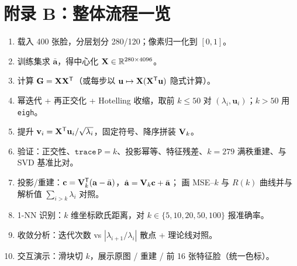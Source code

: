 \section*{附录 B：整体流程一览}

\begin{enumerate}
  \item 载入 400 张脸，分层划分 280/120；像素归一化到 $[0,1]$。
  \item 训练集求 $\bar{\mathbf{a}}$，得中心化 $\mathbf{X}\in\mathbb{R}^{280\times4096}$。
  \item 计算 $\mathbf{G}=\mathbf{X}\mathbf{X}^{\mathsf{T}}$（或每步以 $\mathbf{u}\mapsto\mathbf{X}(\mathbf{X}^{\mathsf{T}}\mathbf{u})$ 隐式计算）。
  \item 幂迭代 + 再正交化 + Hotelling 收缩，取前 $k\le 50$ 对 $(\lambda_i,\mathbf{u}_i)$；$k>50$ 用 \texttt{eigh}。
  \item 提升 $\mathbf{v}_i=\mathbf{X}^{\mathsf{T}}\mathbf{u}_i/\sqrt{\lambda_i}$，固定符号、降序拼装 $\mathbf{V}_k$。
  \item 验证：正交性、$\mathtt{trace}\,\mathtt{P}=k$、投影幂等、特征残差、$k=279$ 满秩重建、与 SVD 基准比对。
  \item 投影/重建：$\mathbf{c}=\mathbf{V}_k^{\mathsf{T}}(\mathbf{a}-\bar{\mathbf{a}})$，$\hat{\mathbf{a}}=\mathbf{V}_k\mathbf{c}+\bar{\mathbf{a}}$；
        画 MSE--$k$ 与 $R(k)$ 曲线并与解析值 $\sum_{i>k}\lambda_i$ 对照。
  \item 1-NN 识别：$k$ 维坐标欧氏距离，对 $k\in\{5,10,20,50,100\}$ 报准确率。
  \item 收敛分析：迭代次数 vs $|\lambda_{i+1}/\lambda_i|$ 散点 + 理论线对照。
  \item 交互演示：滑块切 $k$，展示原图 / 重建 / 前 16 张特征脸（统一色标）。
\end{enumerate}

